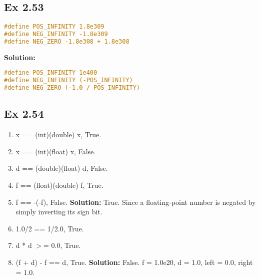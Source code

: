 \subsection{Ex 2.53}
\begin{lstlisting}[language=C]
#define POS_INFINITY 1.8e309
#define NEG_INFINITY -1.8e309
#define NEG_ZERO -1.8e308 + 1.8e308
\end{lstlisting}
{\color{blue}\textbf{Solution: }
\begin{lstlisting}[language=C]
#define POS_INFINITY 1e400
#define NEG_INFINITY (-POS_INFINITY)
#define NEG_ZERO (-1.0 / POS_INFINITY)
\end{lstlisting}

}

\subsection{Ex 2.54}
\begin{enumerate}
    \item x == (int)(double) x, True.
    \item x == (int)(float) x, False.
    \item d == (double)(float) d, False.
    \item f == (float)(double) f, True.
    \item f == -(-f), False. {\color{red}\textbf{Solution: }True. Since a floating-point number is negated by simply inverting its sign bit.}
    \item 1.0/2 == 1/2.0, True.
    \item d * d $>$= 0.0, True.
    \item (f + d) - f == d, True. {\color{red}\textbf{Solution: }False. f = 1.0e20, d = 1.0, left = 0.0, right = 1.0.}
\end{enumerate}

